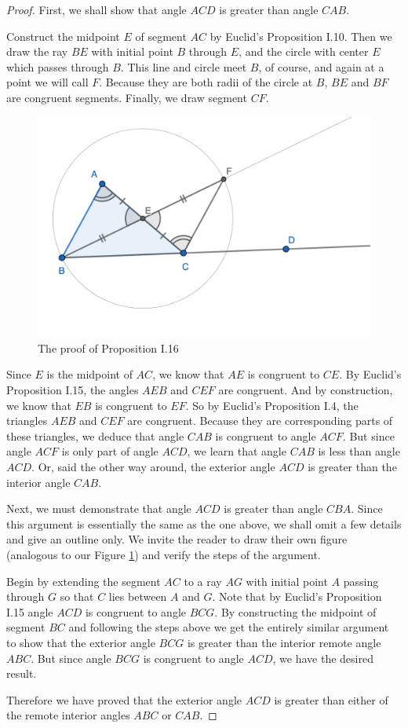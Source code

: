 \documentclass[12pt]{article}
\begin{document}
\begin{proof}
First, we shall show that angle $ACD$ is greater than angle $CAB$.

Construct the midpoint $E$ of segment $AC$ by Euclid's Proposition I.10. Then we draw the ray $BE$ with initial point $B$ through $E$, and the circle with center $E$ which passes through $B$. This line and circle meet $B$, of course, and again at a point we will call $F$. Because they are both radii of the circle at $B$, $BE$ and $BF$ are congruent segments. Finally, we draw segment $CF$.

\begin{figure}[ht]
\centering
\includegraphics[width=.5\textwidth]{example3.png}
\caption{The proof of Proposition I.16}
\label{fig:the-figure}
\end{figure}

Since $E$ is the midpoint of $AC$, we know that $AE$ is congruent to $CE$. By Euclid's Proposition I.15, the angles $AEB$ and $CEF$ are congruent. And by construction, we know that $EB$ is congruent to $EF$. So by Euclid's Proposition I.4, the triangles $AEB$ and $CEF$ are congruent. Because they are corresponding parts of these triangles, we deduce that angle $CAB$ is congruent to angle $ACF$. But since angle $ACF$ is only part of angle $ACD$, we learn that angle $CAB$ is less than angle $ACD$. Or, said the other way around, the exterior angle $ACD$ is greater than the interior angle $CAB$.

Next, we must demonstrate that angle $ACD$ is greater than angle $CBA$. Since this argument is essentially the same as the one above, we shall omit a few details and give an outline only. We invite the reader to draw their own figure (analogous to our Figure \ref{fig:the-figure}) and verify the steps of the argument.

Begin by extending the segment $AC$ to a ray $AG$ with initial point $A$ passing through $G$ so that $C$ lies between $A$ and $G$. Note that by Euclid's Proposition I.15 angle $ACD$ is congruent to angle $BCG$. By constructing the midpoint of segment $BC$ and following the steps above we get the entirely similar argument to show that the exterior angle $BCG$ is greater than the interior remote angle $ABC$.
But since angle $BCG$ is congruent to angle $ACD$, we have the desired result.

Therefore we have proved that the exterior angle $ACD$ is greater than either of the remote interior angles $ABC$ or $CAB$.

\end{proof}
 
 
\end{document}
